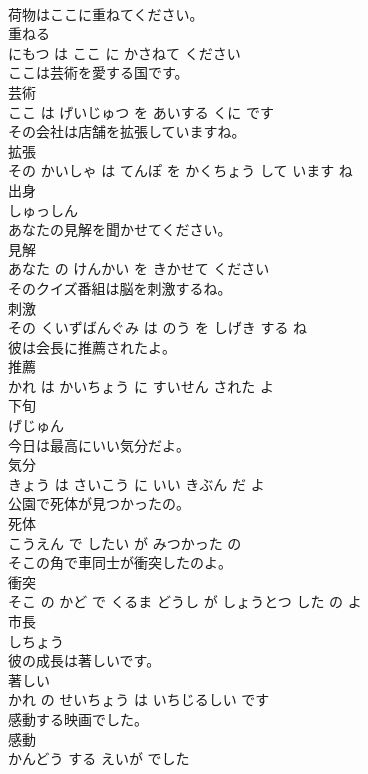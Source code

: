 \documentclass[8pt]{extreport}
\begin{document}
\begin{CJK}{UTF8}{min}
\\	荷物はここに重ねてください。	
\\	重ねる 
\\	にもつ は ここ に かさねて ください			
\\	ここは芸術を愛する国です。	
\\	芸術 
\\	ここ は げいじゅつ を あいする くに です			
\\	その会社は店舗を拡張していますね。	
\\	拡張 
\\	その かいしゃ は てんぽ を かくちょう して います ね			
\\	出身	
\\	しゅっしん			
\\	あなたの見解を聞かせてください。	
\\	見解 
\\	あなた の けんかい を きかせて ください			
\\	そのクイズ番組は脳を刺激するね。	
\\	刺激 
\\	その くいずばんぐみ は のう を しげき する ね			
\\	彼は会長に推薦されたよ。	
\\	推薦 
\\	かれ は かいちょう に すいせん された よ			
\\	下旬	
\\	げじゅん			
\\	今日は最高にいい気分だよ。	
\\	気分 
\\	きょう は さいこう に いい きぶん だ よ			
\\	公園で死体が見つかったの。	
\\	死体 
\\	こうえん で したい が みつかった の			
\\	そこの角で車同士が衝突したのよ。	
\\	衝突 
\\	そこ の かど で くるま どうし が しょうとつ した の よ			
\\	市長	
\\	しちょう			
\\	彼の成長は著しいです。	
\\	著しい 
\\	かれ の せいちょう は いちじるしい です			
\\	感動する映画でした。	
\\	感動 
\\	かんどう する えいが でした			

\end{CJK}
\end{document}
